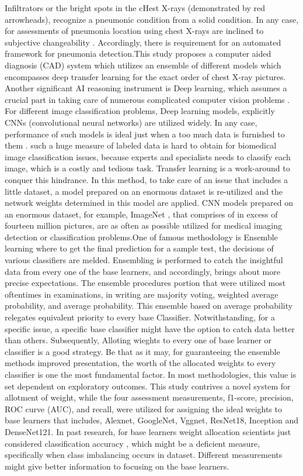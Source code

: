 \documentclass{ieeeaccess}
\begin{document}
Infiltrators or the bright spots in the cHest X-rays (demonstrated by red arrowheads), recognize a pneumonic condition from a solid condition. In any case, for assessments of pneumonia location using chest X-rays are inclined to subjective changeability \cite{b2, b3}. Accordingly, there is requirement for an automated framework for pneumonia detection.This study proposes a computer aided diagnosis (CAD) system which utilizes an ensemble of different models which encompasses deep transfer learning for the exact order of chest X-ray pictures. Another significant AI reasoning instrument is Deep learning, which assumes a crucial part in taking care of numerous complicated computer vision problems \cite{b5, b6}. For different image classification problems, Deep learning models, explicitly CNNs (convolutional neural networks) are utilized widely. In any case, performance of such models is ideal just when a too much data is furnished to them . such a huge measure of labeled data is hard to obtain for biomedical image classification issues, because experts and specialists needs to classify each image, which is a costly and tedious task. Transfer learning is a work-around to conquer this hindrance. In this method, to take care of an issue that includes a little dataset, a model prepared on an enormous dataset is re-utilized and the network weights determined in this model are applied. CNN models prepared on an enormous dataset, for example, ImageNet \cite{b7}, that comprises of in excess of fourteen million pictures, are as often as possible utilized for medical imaging detection or classification problems.One of famous methodology is Ensemble learning where to get the final prediction for a sample test, the decisions of various classifiers are melded. Ensembling is performed to catch the insightful data from every one of the base learners, and accordingly, brings about more precise expectations. The ensemble procedures portion that were utilized most oftentimes in examinations, in writing are majority voting, weighted average probability, and average probability. This ensemble based on average probability relegates equivalent priority to every base Classifier. Notwithstanding, for a specific issue, a specific base classifier might have the option to catch data better than others. Subsequently, Alloting wieghts to every one of base learner or classifier is a good strategy.
Be that as it may, for guaranteeing the ensemble methods improved presentation, the worth of the allocated weights to every classifier is one the most fundamental factor. In most methodologies, this value is set dependent on exploratory outcomes. This study contrives a novel system for allotment of weight, while the four assessment measurements, f1-score, precision, ROC curve (AUC), and recall, were utilized for assigning the ideal weights to base learners that includes, Alexnet, GoogleNet, Vggnet, ResNet18, Inception and DenseNet121. In past research, for base learners weight allocation scientists just considered classification accuracy \cite{b8}, which might be a deficient measure, specifically when class imbalancing occurs in dataset. Different measurements might give better information to focusing on the base learners.
 
\end{document}
